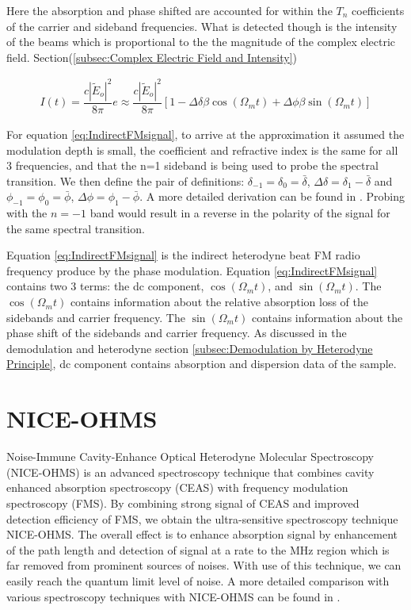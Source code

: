 \documentclass[11pt,a4paper]{book}
\begin{document}
		Here the absorption and phase shifted are accounted for within the $T_n$ coefficients of the carrier and sideband frequencies. What is detected though is the intensity of the beams which is proportional to the the magnitude of the complex electric field. Section(\autoref{subsec:Complex Electric Field and Intensity})
		
		\begin{equation}
			\label{eq:IndirectFMsignal}
			\begin{split}
				I(t) = \dfrac{c|\tilde{E}_o|^2}{8\pi} e \approx \dfrac{c|\tilde{E}_o|^2}{8\pi}[1-\Delta\delta\beta \cos{(\Omega_m t)+\Delta\phi\beta\sin{(\Omega_m t)}}]
			\end{split}
		\end{equation}
		
		For equation \autoref{eq:IndirectFMsignal}, to arrive at the approximation it assumed the modulation depth is small, the coefficient and refractive index is the same for all 3 frequencies, and that the n=1 sideband is being used to probe the spectral transition. We then define the pair of definitions: $\delta_{-1}=\delta_0=\bar{\delta}$, $\Delta\delta = \delta_1 -\bar{\delta}$ and $\phi_{-1}=\phi_0=\bar{\phi}$, $\Delta\phi = \phi_1 -\bar{\phi}$. A more detailed derivation can be found in \cite{FMspec}. Probing with the $n=-1$ band would result in a reverse in the polarity of the signal for the same spectral transition.
		
		Equation \autoref{eq:IndirectFMsignal} is the indirect heterodyne beat FM radio frequency produce by the phase modulation. Equation \autoref{eq:IndirectFMsignal} contains two 3 terms: the dc component, $\cos{(\Omega_m t)}$, and $\sin{(\Omega_m t)}$. The $\cos{(\Omega_m t)}$ contains information about the relative absorption loss of the sidebands and carrier frequency. The $\sin{(\Omega_m t)}$ contains information about the phase shift of the sidebands and carrier frequency. As discussed in the demodulation and heterodyne section \autoref{subsec:Demodulation by Heterodyne Principle}, dc component contains absorption and dispersion data of the sample.
		
	\section{NICE-OHMS}
		\label{sec:Noise-Immune Cavity-Enhance Optical Heterodyne Molecular Spectroscopy}
		Noise-Immune Cavity-Enhance Optical Heterodyne Molecular Spectroscopy (NICE-OHMS) is an advanced spectroscopy technique that combines cavity enhanced absorption spectroscopy (CEAS) with frequency modulation spectroscopy (FMS). By combining strong signal of CEAS and improved detection efficiency of FMS, we obtain the ultra-sensitive spectroscopy technique NICE-OHMS. The overall effect is to enhance absorption signal by enhancement of the path length and detection of signal at a rate to the MHz region which is far removed from prominent sources of noises. With use of this technique, we can easily reach the quantum limit level of noise. A more detailed comparison with various spectroscopy techniques with NICE-OHMS can be found in \cite{NICE-OHMS}.
		
\end{document}
